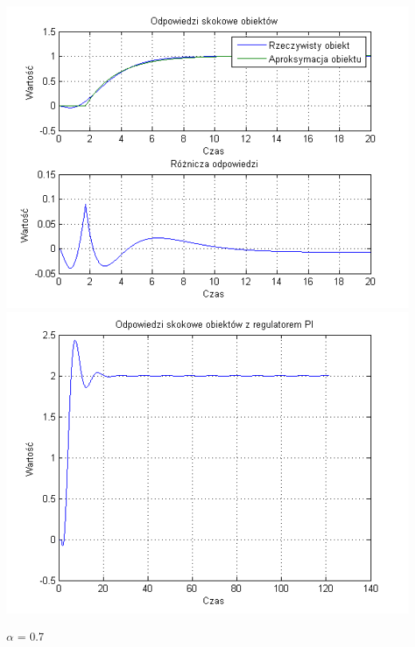 \documentclass[10pt,a4paper]{article}
\begin{document}
\begin{center}
\includegraphics[scale=1]{images/jeden/skrypt_235.png}\\
\includegraphics[scale=1]{images/jeden/skrypt_236.png}\\
\end{center}
\newpage
$\alpha$ = 0.7
\end{document}
